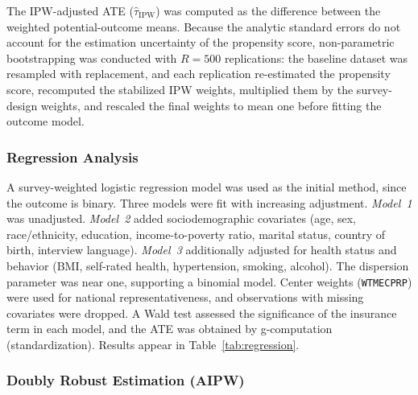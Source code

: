 \documentclass[12pt]{article}
\begin{document}
The IPW-adjusted ATE ($\hat{\tau}_{\mathrm{IPW}}$) was computed as the difference
between the weighted potential-outcome means. Because the analytic standard
errors do not account for the estimation uncertainty of the propensity score,
non-parametric bootstrapping was conducted with $R = 500$ replications: the
baseline dataset was resampled with replacement, and each replication
re-estimated the propensity score, recomputed the stabilized IPW weights,
multiplied them by the survey-design weights, and rescaled the final weights to
mean one before fitting the outcome model.

\subsubsection{Regression Analysis}

A survey-weighted logistic regression model was used as the initial method,
since the outcome is binary. Three models were fit with increasing adjustment.
\emph{Model~1} was unadjusted. \emph{Model~2} added sociodemographic covariates
(age, sex, race/ethnicity, education, income-to-poverty ratio, marital status,
country of birth, interview language). \emph{Model~3} additionally adjusted for
health status and behavior (BMI, self-rated health, hypertension, smoking,
alcohol). The dispersion parameter was near one, supporting a binomial model.
Center weights (\texttt{WTMECPRP}) were used for national representativeness, and
observations with missing covariates were dropped. A Wald test assessed the
significance of the insurance term in each model, and the ATE was obtained by
g-computation (standardization). Results appear in Table~\ref{tab:regression}.

\subsubsection{Doubly Robust Estimation (AIPW)}
\end{document}

